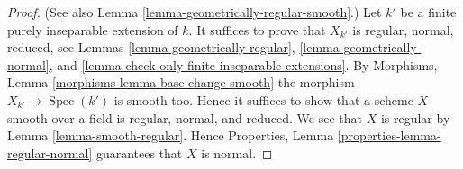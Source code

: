 \documentclass[10pt,a4paper]{amsart}
\theoremstyle{plain}
\theoremstyle{definition}
\theoremstyle{remark}
\numberwithin{equation}{subsection}
\def\Spec{\mathop{\mathrm{Spec}}}
\begin{document}
\begin{proof}
(See also
Lemma \ref{lemma-geometrically-regular-smooth}.)
Let $k'$ be a finite purely inseparable extension of $k$.
It suffices to prove that $X_{k'}$ is regular, normal, reduced, see
Lemmas \ref{lemma-geometrically-regular},
\ref{lemma-geometrically-normal}, and
\ref{lemma-check-only-finite-inseparable-extensions}.
By
Morphisms, Lemma \ref{morphisms-lemma-base-change-smooth}
the morphism $X_{k'} \to \Spec(k')$ is smooth too.
Hence it suffices to show that a scheme $X$ smooth over a field is regular,
normal, and reduced. We see that $X$ is regular by
Lemma \ref{lemma-smooth-regular}.
Hence
Properties, Lemma \ref{properties-lemma-regular-normal}
guarantees that $X$ is normal.
\end{proof}
\end{document}
